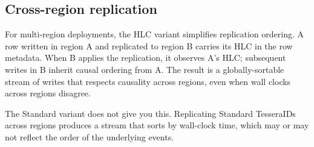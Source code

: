 \subsection{Cross-region replication}

For multi-region deployments, the HLC variant simplifies replication ordering. A row written in region A and replicated to region B carries its HLC in the row metadata. When B applies the replication, it observes A's HLC; subsequent writes in B inherit causal ordering from A. The result is a globally-sortable stream of writes that respects causality across regions, even when wall clocks across regions disagree.

The Standard variant does not give you this. Replicating Standard TesseraIDs across regions produces a stream that sorts by wall-clock time, which may or may not reflect the order of the underlying events.

